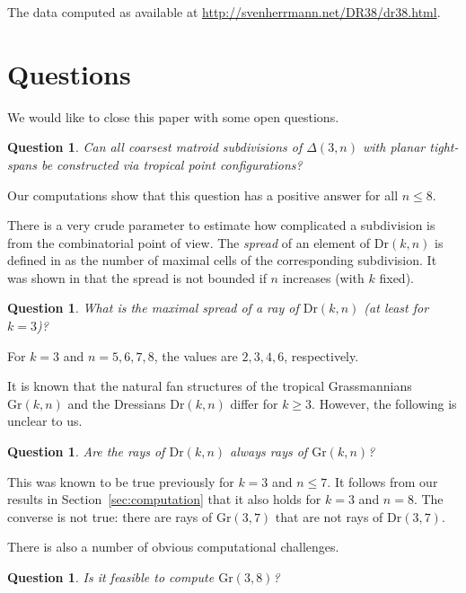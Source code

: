 \documentclass[11pt,a4paper]{amsart}
\newcommand{\Gr}[2]{{\mathrm{Gr}(#1,#2)}}
\newcommand{\Dr}[2]{{\mathrm{Dr}(#1,#2)}}
\theoremstyle{plain}
\newtheorem{question}[theorem]{Question}
\theoremstyle{definition}
\begin{document}
The data computed as available at \url{http://svenherrmann.net/DR38/dr38.html}.

\section{Questions}

We would like to close this paper with some open questions.

\begin{question}
  Can all coarsest matroid subdivisions of $\Delta(3,n)$ with planar tight-spans be constructed via
  tropical point configurations?
\end{question}

Our computations show that this question has a positive answer for all $n\le 8$.

\medskip

There is a very crude parameter to estimate how complicated a subdivision is from the combinatorial
point of view.  The \emph{spread} of an element of $\Dr kn$ is defined in as the number of maximal
cells of the corresponding subdivision. It was shown in \cite[Prop.~3.7]{MR2515769} that the spread
is not bounded if $n$ increases (with $k$ fixed).

\begin{question}
  What is the maximal \emph{spread} of a ray of $\Dr kn$ (at least for $k=3$)?
\end{question}
 
For $k=3$ and $n=5,6,7,8$, the values are $2,3,4,6$, respectively.

\medskip

It is known that the natural fan structures of the tropical Grassmannians $\Gr kn$ and the Dressians
$\Dr kn$ differ for $k\ge 3$.  However, the following is unclear to us.

\begin{question}
  Are the rays of $\Dr kn$ always rays of $\Gr kn$?
\end{question}

This was known to be true previously for $k=3$ and $n\leq 7$.  It follows from our results in
Section~\ref{sec:computation} that it also holds for $k=3$ and $n=8$.  The converse is not true:
there are rays of $\Gr 37$ that are not rays of $\Dr{3}{7}$.

\medskip

There is also a number of obvious computational challenges.

\begin{question}
  Is it feasible to compute $\Gr{3}{8}$?
\end{question}
\end{document}
